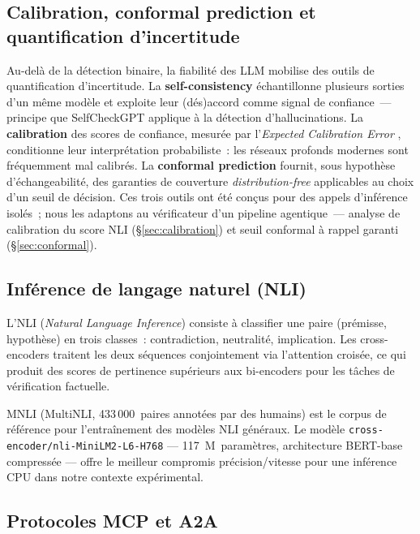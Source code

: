 \documentclass[12pt,a4paper]{article}
\begin{document}
\subsection{Calibration, conformal prediction et quantification d'incertitude}

Au-delà de la détection binaire, la fiabilité des LLM mobilise des outils de quantification d'incertitude. La \textbf{self-consistency} \cite{wang2022selfconsistency} échantillonne plusieurs sorties d'un même modèle et exploite leur (dés)accord comme signal de confiance~--- principe que SelfCheckGPT \cite{manakul2023selfcheckgpt} applique à la détection d'hallucinations. La \textbf{calibration} des scores de confiance, mesurée par l'\textit{Expected Calibration Error} \cite{guo2017calibration}, conditionne leur interprétation probabiliste~: les réseaux profonds modernes sont fréquemment mal calibrés. La \textbf{conformal prediction} \cite{angelopoulos2023conformal} fournit, sous hypothèse d'échangeabilité, des garanties de couverture \textit{distribution-free} applicables au choix d'un seuil de décision. Ces trois outils ont été conçus pour des appels d'inférence isolés~; nous les adaptons au vérificateur d'un pipeline agentique~--- analyse de calibration du score NLI (§\ref{sec:calibration}) et seuil conformal à rappel garanti (§\ref{sec:conformal}).

\subsection{Inférence de langage naturel (NLI)}

L'NLI (\textit{Natural Language Inference}) consiste à classifier une paire (prémisse, hypothèse) en trois classes~: contradiction, neutralité, implication. Les cross-encoders \cite{humeau2020polyencoders} traitent les deux séquences conjointement via l'attention croisée, ce qui produit des scores de pertinence supérieurs aux bi-encoders pour les tâches de vérification factuelle.

MNLI \cite{williams2018mnli} (MultiNLI, 433\,000~paires annotées par des humains) est le corpus de référence pour l'entraînement des modèles NLI généraux. Le modèle \texttt{cross-encoder/nli-MiniLM2-L6-H768} \cite{reimers2019sbert} --- 117~M~paramètres, architecture BERT-base compressée --- offre le meilleur compromis précision/vitesse pour une inférence CPU dans notre contexte expérimental.

\subsection{Protocoles MCP et A2A}
\end{document}
